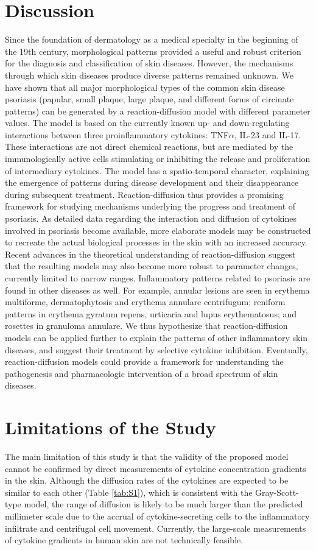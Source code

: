 \section{Discussion}
Since the foundation of dermatology as a medical specialty in the beginning of the 19th century, morphological patterns provided a useful and robust criterion for the diagnosis and classification of skin diseases. However, the mechanisms through which skin diseases produce diverse patterns remained unknown. We have shown that all major morphological types of the common skin disease psoriasis (papular, small plaque, large plaque, and different forms of circinate patterns) can be generated by a reaction-diffusion model with different parameter values. The model is based on the currently known up- and down-regulating interactions between three proinflammatory cytokines: TNF$\alpha$, IL-23 and IL-17. These interactions are not direct chemical reactions, but are mediated by the immunologically active cells stimulating or inhibiting the release and proliferation of intermediary cytokines. The model has a spatio-temporal character, explaining the emergence of patterns during disease development and their disappearance during subsequent treatment. Reaction-diffusion thus provides a promising framework for studying mechanisms underlying the progress and treatment of psoriasis. As detailed data regarding the interaction and diffusion of cytokines involved in psoriasis become available, more elaborate models may be constructed to recreate the actual biological processes in the skin with an increased accuracy. Recent advances in the theoretical understanding of reaction-diffusion \citep{diego2018} suggest that the resulting models may also become more robust to parameter changes, currently limited to narrow ranges. Inflammatory patterns related to psoriasis are found in other diseases as well. For example, annular lesions are seen in erythema multiforme, dermatophytosis and erythema annulare centrifugum; reniform patterns in erythema gyratum repens, urticaria and lupus erythematosus; and rosettes in granuloma annulare. We thus hypothesize that reaction-diffusion models can be applied further to explain the patterns of other inflammatory skin diseases, and suggest their treatment by selective cytokine inhibition. Eventually, reaction-diffusion models could provide a framework for understanding the pathogenesis and pharmacologic intervention of a broad spectrum of skin diseases. 

\section{Limitations of the Study}
The main limitation of this study is that the validity of the proposed model cannot be confirmed by direct measurements of cytokine concentration gradients in the skin. Although the diffusion rates of the cytokines are expected to be similar to each other (Table \ref{tab:S1}), which is consistent with the Gray-Scott-type model, the range of diffusion is likely to be much larger than the predicted millimeter scale due to the accrual of cytokine-secreting cells to the inflammatory infiltrate and centrifugal cell movement. Currently, the large-scale measurements of cytokine gradients in human skin are not technically feasible. 

